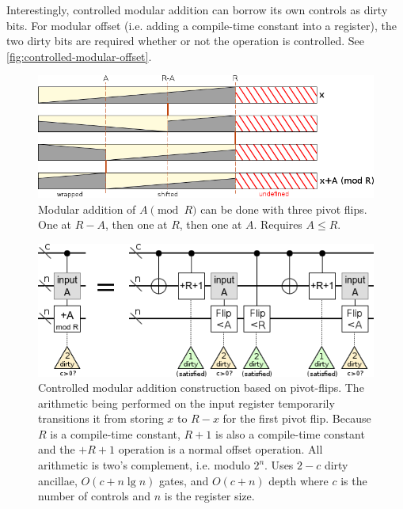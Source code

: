 \documentclass[twocolumn,longbibliography]{quantumarticle}
\begin{document}
Interestingly, controlled modular addition can borrow its own controls as dirty bits.
For modular offset (i.e. adding a compile-time constant into a register), the two dirty bits are required whether or not the operation is controlled.
See \autoref{fig:controlled-modular-offset}.

\begin{figure}
  \centering
  \includegraphics[width=\linewidth]{assets/mod-add-from-pivot-flip-bars.png}
  \caption{
     Modular addition of $A \pmod{R}$ can be done with three pivot flips.
     One at $R-A$, then one at $R$, then one at $A$.
     Requires $A \leq R$.
   }
  \label{fig:mod-add-from-pivot-flip-bars}
\end{figure}

\begin{figure}
  \centering
  \includegraphics[width=\linewidth]{assets/controlled-modular-addition.png}
  \caption{
    Controlled modular addition construction based on pivot-flips.
    The arithmetic being performed on the input register temporarily transitions it from storing $x$ to $R-x$ for the first pivot flip.
    Because $R$ is a compile-time constant, $R+1$ is also a compile-time constant and the $+R+1$ operation is a normal offset operation.
    All arithmetic is two's complement, i.e. modulo $2^n$.
    Uses $2-c$ dirty ancillae, $O(c + n \lg n)$ gates, and $O(c + n)$ depth where $c$ is the number of controls and $n$ is the register size.
  }
  \label{fig:controlled-modular-add}
\end{figure}
\end{document}
